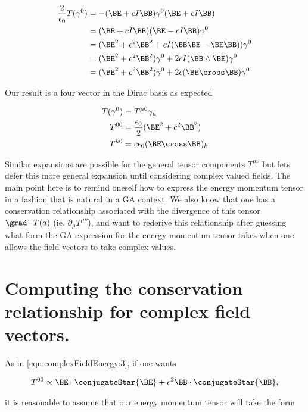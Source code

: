 \begin{align*}
\frac{2}{\epsilon_0} T(\gamma^0) 
&= -(\BE + c I \BB) \gamma^0 (\BE + c I \BB) \\
&= (\BE + c I \BB) (\BE - c I \BB) \gamma^0 \\
&= (\BE^2 + c^2 \BB^2 + c I (\BB \BE - \BE \BB)) \gamma^0 \\
&= (\BE^2 + c^2 \BB^2) \gamma^0 + 2 c I ( \BB \wedge \BE ) \gamma^0 \\
&= (\BE^2 + c^2 \BB^2) \gamma^0 + 2 c ( \BE \cross \BB ) \gamma^0 \\
\end{align*}

Our result is a four vector in the Dirac basis as expected

\begin{subequations}
\label{eqn:complexFieldEnergy:7}
\begin{align}
T(\gamma^0) &= T^{\mu 0} \gamma_\mu \\
T^{0 0} &= \frac{\epsilon_0}{2} (\BE^2 + c^2 \BB^2) \\
T^{k 0} &= c \epsilon_0 (\BE \cross \BB)_k 
\end{align}
\end{subequations}

Similar expansions are possible for the general tensor components $T^{\mu\nu}$ but lets defer this more general expansion until considering complex valued fields.  The main point here is to remind oneself how to express the energy momentum tensor in a fashion that is natural in a GA context.  We also know that one has a conservation relationship associated with the divergence of this tensor $\grad \cdot T(a)$ (ie. $\partial_\mu T^{\mu\nu}$), and want to rederive this relationship after guessing what form the GA expression for the energy momentum tensor takes when one allows the field vectors to take complex values.

\section{Computing the conservation relationship for complex field vectors.}

As in \ref{eqn:complexFieldEnergy:3}, if one wants

\begin{align}\label{eqn:complexFieldEnergy:8}
T^{0 0} \propto \BE \cdot \conjugateStar{\BE} + c^2 \BB \cdot \conjugateStar{\BB},
\end{align}

it is reasonable to assume that our energy momentum tensor will take the form

